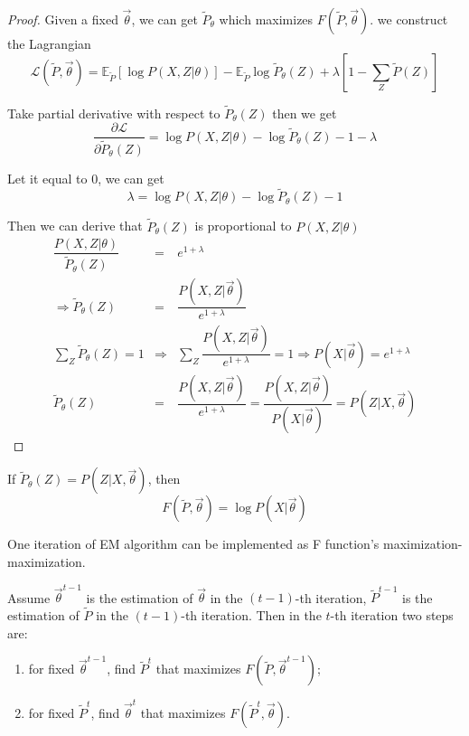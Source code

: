 \begin{proof}
Given a fixed $\vec{\theta}$, we can get $\tilde{P}_{\theta}$ which maximizes $F(\tilde{P},\vec{\theta})$. we construct the Lagrangian
\begin{equation}
\mathcal{L}(\tilde{P}, \vec{\theta})=\mathbb{E}_{\tilde{P}}\left[\log{P(X,Z|\theta)}\right]-\mathbb{E}_{\tilde{P}}\log\tilde{P}_{\theta}(Z)+\lambda\left[1-\sum\limits_Z{\tilde{P}(Z)}\right]
\end{equation}

Take partial derivative with respect to $\tilde{P}_{\theta}(Z)$ then we get
\begin{equation}
\dfrac{\partial \mathcal{L}}{\partial{\tilde{P}_{\theta}(Z)}}=\log{P(X,Z|\theta)}-\log\tilde{P}_{\theta}(Z)-1-\lambda  \nonumber
\end{equation}

Let it equal to 0, we can get
\begin{equation}
\lambda=\log{P(X,Z|\theta)}-\log\tilde{P}_{\theta}(Z)-1 \nonumber
\end{equation}

Then we can derive that $\tilde{P}_{\theta}(Z)$ is proportional to $P(X,Z|\theta)$
\begin{eqnarray}
\dfrac{P(X,Z|\theta)}{\tilde{P}_{\theta}(Z)} &=& e^{1+\lambda} \nonumber \\
\Rightarrow \tilde{P}_{\theta}(Z) &=& \dfrac{P(X,Z|\vec{\theta})}{e^{1+\lambda}} \nonumber \\
\sum\limits_Z{\tilde{P}_{\theta}(Z)}=1 & \Rightarrow & \sum\limits_Z{\dfrac{P(X,Z|\vec{\theta})}{e^{1+\lambda}}}=1 \Rightarrow P(X|\vec{\theta})=e^{1+\lambda} \nonumber \\
\tilde{P}_{\theta}(Z) &=& \dfrac{P(X,Z|\vec{\theta})}{e^{1+\lambda}} = \dfrac{P(X,Z|\vec{\theta})}{P(X|\vec{\theta})}=P(Z|X, \vec{\theta}) \nonumber
\end{eqnarray}
\end{proof}

\begin{lemma}
If $\tilde{P}_{\theta}(Z)=P(Z|X, \vec{\theta})$, then
\begin{equation}
F(\tilde{P},\vec{\theta})=\log P(X|\vec{\theta})
\end{equation}
\end{lemma}

\begin{theorem}
One iteration of EM algorithm can be implemented as F function's maximization-maximization.

Assume $\vec{\theta}^{t-1}$ is the estimation of $\vec{\theta}$ in the $(t-1)$-th iteration, $\tilde{P}^{t-1}$ is the estimation of $\tilde{P}$ in the $(t-1)$-th iteration. Then in the $t$-th iteration two steps are:
\begin{enumerate}
\item for fixed $\vec{\theta}^{t-1}$, find $\tilde{P}^t$ that maximizes $F(\tilde{P},\vec{\theta}^{t-1})$;
\item for fixed $\tilde{P}^t$, find $\vec{\theta}^t$ that maximizes $F(\tilde{P}^t,\vec{\theta})$.
\end{enumerate}
\end{theorem}

